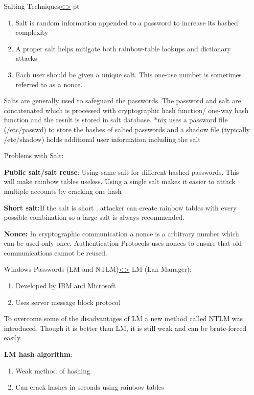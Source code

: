 \documentclass[12pt]{article}
\newenvironment{instructionblock}{\Large\bgroup}{\egroup}
\newcommand{\ben}{\begin{enumerate}}
\newcommand{\een}{\end{enumerate}}
\begin{document}
\pagebreak
\begin{slide}{Salting Techniques}{\hyperref[slide 2]{\textless}\hyperref[slide 4]{\textgreater}}
	 pt
	\begin{instructionblock}
		\ben
			\item 	Salt is random information appended to a password to increase its hashed complexity
			\item 	A proper salt helps mitigate both rainbow-table lookups and dictionary attacks
			\item   Each user should be given a unique salt. This one-use number is sometimes referred to as a nonce.
	\een
	\end{instructionblock}
\end{slide}

\vfill 


Salts are generally used to safeguard the passwords. The password and salt are concatenated which is processed with cryptographic hash function/ one-way hash function and the result is stored in salt database. *nix uses a password file (/etc/passwd) to store the hashes of salted passwords and a shadow file (typically /etc/shadow) holds additional user information including the salt

Problems with Salt:

\textbf{Public salt/salt reuse}: Using same salt for different hashed passwords. This will make rainbow tables useless.
Using a single salt makes it easier to attack multiple accounts by cracking one hash 

\textbf{Short salt:}If the salt is short , attacker can create rainbow tables with every possible combination so a large salt is always recommended.

\cite{book}

\textbf{Nonce:} In cryptographic communication a nonce is a arbitrary number which can be used only once. Authentication Protocols uses nonces to ensure that old communications cannot be reused\cite{nonce}.



\pagebreak
\begin{slide}{Windows Passwords (LM and NTLM)}{\hyperref[slide 3]{\textless}\hyperref[slide 5]{\textgreater}}
	\vskip 10pt
	\begin{instructionblock}
		LM (Lan Manager):
		\begin{enumerate}
			\item Developed by IBM and Microsoft
			\item Uses server message block protocol
		\end{enumerate}
	To overcome some of the disadvantages of LM a new method called NTLM was introduced. Though it is better than LM, it is still weak and can be brute-forced easily.
	
	\end{instructionblock}
\end{slide}
\vfill
\textbf{LM hash algorithm}:
\begin{enumerate}
	\item 	Weak method of hashing
	\item   Can crack hashes in seconds using rainbow tables
\end{enumerate}
\end{document}
